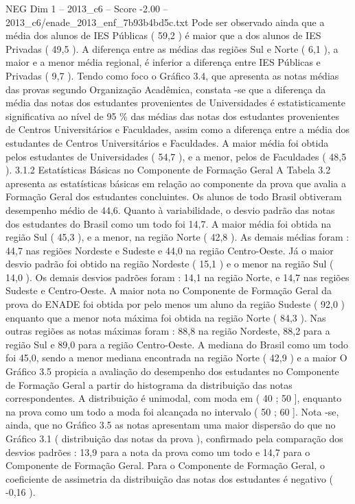 \begin{textsample}{NEG Dim 1 – 2013\_c6 – Score -2.00 – 2013\_c6/enade\_2013\_enf\_7b93b4bd5c.txt}
Pode ser observado ainda que a média dos alunos de IES Públicas ( 59,2 ) é maior que a dos alunos de IES Privadas ( 49,5 ).
A diferença entre as médias das regiões Sul e Norte ( 6,1 ), a maior e a menor média regional, é inferior a diferença entre IES Públicas e Privadas ( 9,7 ).
Tendo como foco o Gráfico 3.4, que apresenta as notas médias das provas segundo Organização Acadêmica, constata -se que a diferença da média das notas dos estudantes provenientes de Universidades é estatisticamente significativa ao nível de 95 \% das médias das notas dos estudantes provenientes de Centros Universitários e Faculdades, assim como a diferença entre a média dos estudantes de Centros Universitários e Faculdades.
A maior média foi obtida pelos estudantes de Universidades ( 54,7 ), e a menor, pelos de Faculdades ( 48,5 ). 3.1.2 Estatísticas Básicas no Componente de Formação Geral A Tabela 3.2 apresenta as estatísticas básicas em relação ao componente da prova que avalia a Formação Geral dos estudantes concluintes.
Os alunos de todo Brasil obtiveram desempenho médio de 44,6.
Quanto à variabilidade, o desvio padrão das notas dos estudantes do Brasil como um todo foi 14,7.
A maior média foi obtida na região Sul ( 45,3 ), e a menor, na região Norte ( 42,8 ).
As demais médias foram : 44,7 nas regiões Nordeste e Sudeste e 44,0 na região Centro-Oeste.
Já o maior desvio padrão foi obtido na região Nordeste ( 15,1 ) e o menor na região Sul ( 14,0 ).
Os demais desvios padrões foram : 14,1 na região Norte, e 14,7 nas regiões Sudeste e Centro-Oeste.
A maior nota no Componente de Formação Geral da prova do ENADE foi obtida por pelo menos um aluno da região Sudeste ( 92,0 ) enquanto que a menor nota máxima foi obtida na região Norte ( 84,3 ).
Nas outras regiões as notas máximas foram : 88,8 na região Nordeste, 88,2 para a região Sul e 89,0 para a região Centro-Oeste.
A mediana do Brasil como um todo foi 45,0, sendo a menor mediana encontrada na região Norte ( 42,9 ) e a maior O Gráfico 3.5 propicia a avaliação do desempenho dos estudantes no Componente de Formação Geral a partir do histograma da distribuição das notas correspondentes.
A distribuição é unimodal, com moda em ( 40 ; 50 ], enquanto na prova como um todo a moda foi alcançada no intervalo ( 50 ; 60 ].
Nota -se, ainda, que no Gráfico 3.5 as notas apresentam uma maior dispersão do que no Gráfico 3.1 ( distribuição das notas da prova ), confirmado pela comparação dos desvios padrões : 13,9 para a nota da prova como um todo e 14,7 para o Componente de Formação Geral.
Para o Componente de Formação Geral, o coeficiente de assimetria da distribuição das notas dos estudantes é negativo ( -0,16 ).

\end{textsample}
